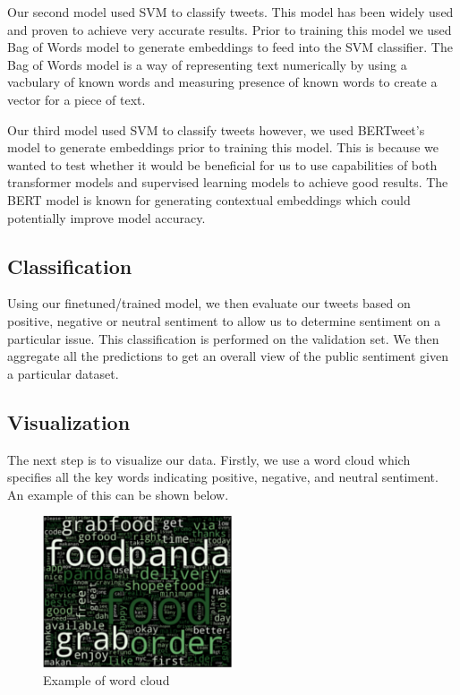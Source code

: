 \documentclass[conference]{IEEEtran}
\begin{document}
 



Our second model used SVM to classify tweets. This model has been widely used and proven to achieve very accurate results. Prior to training this model we used Bag of Words model to generate embeddings to feed into the SVM classifier. The Bag of Words model is a way of representing text numerically by using a vacbulary of known words and measuring presence of known words to create a vector for a piece of text\cite{b19}.

Our third model used SVM to classify tweets however, we used BERTweet's model to generate embeddings prior to training this model. This is because we wanted to test whether it would be beneficial for us to use capabilities of both transformer models and supervised learning models to achieve good results. The BERT model is known for generating contextual embeddings which could potentially improve model accuracy\cite{b17}. 


\subsection{Classification}
Using our finetuned/trained model, we then evaluate our tweets based on positive, negative or neutral sentiment to allow us to determine sentiment on a particular issue. This classification is performed on the validation set.
We then aggregate all the predictions to get an overall view of the public sentiment given a particular dataset. 

\subsection{Visualization}
The next step is to visualize our data. 
Firstly, we use a word cloud which specifies all the key words indicating positive, negative, and neutral sentiment. 
An example of this can be shown below.

\begin{figure}[t]
    \includegraphics[width=0.5\textwidth]{wordcloud.png}
    \caption{Example of word cloud\cite{b2}}
\end{figure}
\end{document}
